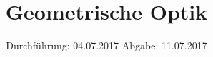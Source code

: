 

\subject{V408}
\title{\texorpdfstring{Geometrische Optik}{}}
\date{
	Durchführung: 04.07.2017
	\hspace{4em}
	Abgabe: 11.07.2017
}


	\maketitle
	\newpage
	\tableofcontents
	\newpage
	
	
	
	
	
	
	\newpage

	\printbibliography
